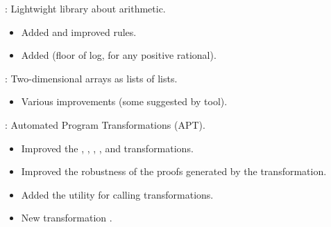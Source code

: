 \begin{frame}

\implibtitle

:
Lightwight library about arithmetic.
\begin{itemize}
\item Added and improved rules.
\item Added  (floor of log, for any positive rational).
\end{itemize}

\end{frame}


\begin{frame}

\implibtitle

:
Two-dimensional arrays as lists of lists.
\begin{itemize}
\item Various improvements (some suggested by  tool).
\end{itemize}

\end{frame}


\begin{frame}

\implibtitle

:
Automated Program Transformations (APT).
\begin{itemize}
\item Improved the , ,
  , , and
   transformations.
\item Improved the robustness of the proofs
  generated by the  transformation.
\item Added the  utility for calling transformations.
\item New transformation .
\end{itemize}

\end{frame}


